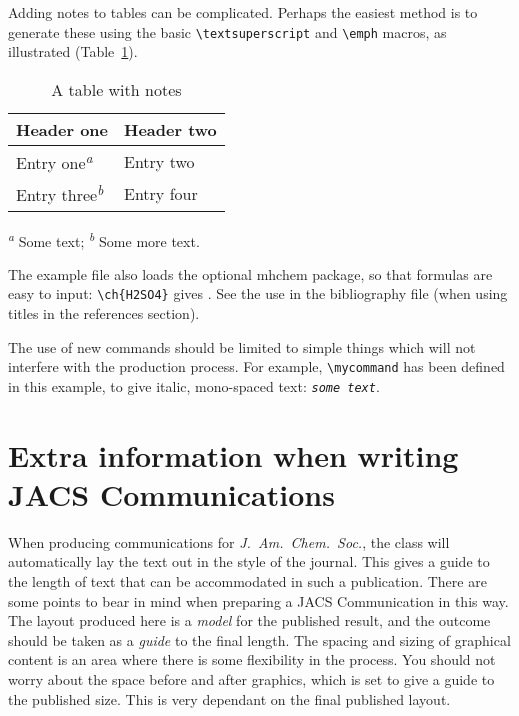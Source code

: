 \documentclass[journal=jacsat,manuscript=article]{achemso}
\newcommand*\mycommand[1]{\texttt{\emph{#1}}}
\begin{document}
Adding notes to tables can be complicated.  Perhaps the easiest
method is to generate these using the basic
\texttt{\textbackslash textsuperscript} and
\texttt{\textbackslash emph} macros, as illustrated (Table~\ref{tbl:notes}).
\begin{table}
  \caption{A table with notes}
  \label{tbl:notes}
  \begin{tabular}{ll}
    \hline
    Header one                            & Header two \\
    \hline
    Entry one\textsuperscript{\emph{a}}   & Entry two  \\
    Entry three\textsuperscript{\emph{b}} & Entry four \\
    \hline
  \end{tabular}

  \textsuperscript{\emph{a}} Some text;
  \textsuperscript{\emph{b}} Some more text.
\end{table}

The example file also loads the optional \textsf{mhchem} package, so
that formulas are easy to input: \texttt{\textbackslash ch\{H2SO4\}}
gives .  See the use in the bibliography file (when using
titles in the references section).

The use of new commands should be limited to simple things which will
not interfere with the production process.  For example,
\texttt{\textbackslash mycommand} has been defined in this example,
to give italic, mono-spaced text: \mycommand{some text}.

\section{Extra information when writing JACS Communications}

When producing communications for \emph{J.~Am.\ Chem.\ Soc.}, the
class will automatically lay the text out in the style of the
journal. This gives a guide to the length of text that can be
accommodated in such a publication. There are some points to bear in
mind when preparing a JACS Communication in this way.  The layout
produced here is a \emph{model} for the published result, and the
outcome should be taken as a \emph{guide} to the final length. The
spacing and sizing of graphical content is an area where there is
some flexibility in the process.  You should not worry about the
space before and after graphics, which is set to give a guide to the
published size. This is very dependant on the final published layout.
\end{document}
